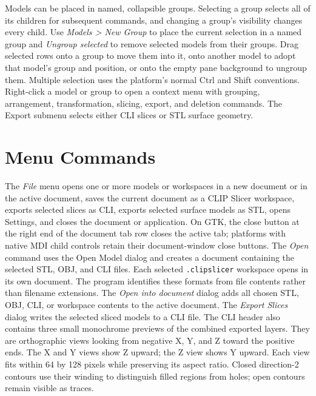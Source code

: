 Models can be placed in named, collapsible groups. Selecting a group selects
all of its children for subsequent commands, and changing a group's visibility
changes every child. Use \emph{Models > New Group} to place the current
selection in a named group and \emph{Ungroup selected} to remove selected
models from their groups. Drag selected rows onto a group to move them into it,
onto another model to adopt that model's group and position, or onto the empty
pane background to ungroup them. Multiple selection uses the platform's normal
Ctrl and Shift conventions. Right-click a model or group to open a context
menu with grouping, arrangement, transformation, slicing, export, and deletion
commands. The Export submenu selects either CLI slices or STL surface geometry.

\section{Menu Commands}
\label{document-menus}

The \emph{File} menu opens one or more models or workspaces in a new document
or in the active document, saves the current document as a CLIP Slicer
workspace, exports selected slices as CLI, exports selected surface models as
STL, opens Settings, and closes the document or application. On GTK, the close button at
the right end of the document tab row closes the active tab; platforms with
native MDI child controls retain their document-window close buttons.
\hypertarget{open-model-dialog}{}The \emph{Open} command uses the Open Model
dialog and creates a document containing the selected STL, OBJ, and CLI files.
Each selected \texttt{.clipslicer} workspace opens in its own document.
The program identifies these formats from file contents rather than filename
extensions.
\hypertarget{open-into-document-dialog}{}The \emph{Open into document}
dialog adds all chosen STL, OBJ, CLI, or workspace contents to the active document.
\hypertarget{export-slices-dialog}{}The \emph{Export Slices} dialog writes the
selected sliced models to a CLI file. The CLI header also contains three small
monochrome previews of the combined exported layers. They are orthographic
views looking from negative X, Y, and Z toward the positive ends. The X and Y
views show Z upward; the Z view shows Y upward. Each view fits within 64 by 128
pixels while preserving its aspect ratio.
Closed direction-2 contours use their winding to distinguish filled regions
from holes; open contours remain visible as traces.

